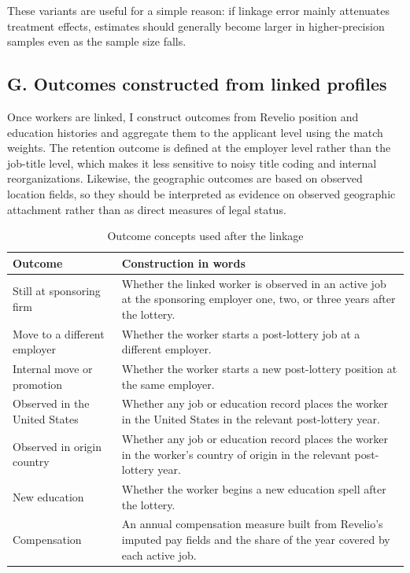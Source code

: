 These variants are useful for a simple reason: if linkage error mainly attenuates treatment effects, estimates should generally become larger in higher-precision samples even as the sample size falls.

\subsection{G. Outcomes constructed from linked profiles}

Once workers are linked, I construct outcomes from Revelio position and education histories and aggregate them to the applicant level using the match weights. The retention outcome is defined at the employer level rather than the job-title level, which makes it less sensitive to noisy title coding and internal reorganizations. Likewise, the geographic outcomes are based on observed location fields, so they should be interpreted as evidence on observed geographic attachment rather than as direct measures of legal status.

\begin{table}[H]
\centering
\caption{Outcome concepts used after the linkage}
\label{tab:outcome_defs}
\begin{tabularx}{\textwidth}{@{}l X@{}}
\toprule
Outcome & Construction in words \\
\midrule
Still at sponsoring firm & Whether the linked worker is observed in an active job at the sponsoring employer one, two, or three years after the lottery. \\
Move to a different employer & Whether the worker starts a post-lottery job at a different employer. \\
Internal move or promotion & Whether the worker starts a new post-lottery position at the same employer. \\
Observed in the United States & Whether any job or education record places the worker in the United States in the relevant post-lottery year. \\
Observed in origin country & Whether any job or education record places the worker in the worker's country of origin in the relevant post-lottery year. \\
New education & Whether the worker begins a new education spell after the lottery. \\
Compensation & An annual compensation measure built from Revelio's imputed pay fields and the share of the year covered by each active job. \\
\bottomrule
\end{tabularx}
\end{table}

